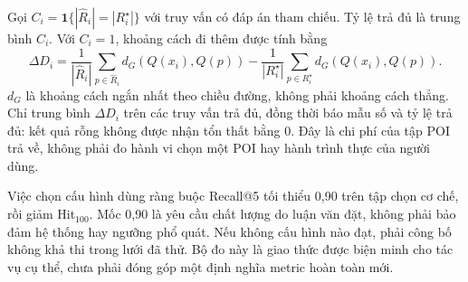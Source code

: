 Gọi $C_i=\mathbf1\{|\widehat R_i|=|R_i^\star|\}$ với truy vấn có đáp án tham chiếu. Tỷ lệ trả đủ là trung bình $C_i$. Với $C_i=1$, khoảng cách đi thêm được tính bằng
\[
\Delta D_i=\frac{1}{|\widehat R_i|}\sum_{p\in\widehat R_i}d_G(Q(x_i),Q(p))
-\frac{1}{|R_i^\star|}\sum_{p\in R_i^\star}d_G(Q(x_i),Q(p)).
\]
$d_G$ là khoảng cách ngắn nhất theo chiều đường, không phải khoảng cách thẳng. Chỉ trung bình $\Delta D_i$ trên các truy vấn trả đủ, đồng thời báo mẫu số và tỷ lệ trả đủ: kết quả rỗng không được nhận tổn thất bằng 0. Đây là chi phí của tập POI trả về, không phải đo hành vi chọn một POI hay hành trình thực của người dùng.

Việc chọn cấu hình dùng ràng buộc Recall@5 tối thiểu 0,90 trên tập chọn cơ chế, rồi giảm Hit$_{100}$. Mốc 0,90 là yêu cầu chất lượng do luận văn đặt, không phải bảo đảm hệ thống hay ngưỡng phổ quát. Nếu không cấu hình nào đạt, phải công bố không khả thi trong lưới đã thử. Bộ đo này là giao thức được biện minh cho tác vụ cụ thể, chưa phải đóng góp một định nghĩa metric hoàn toàn mới.
